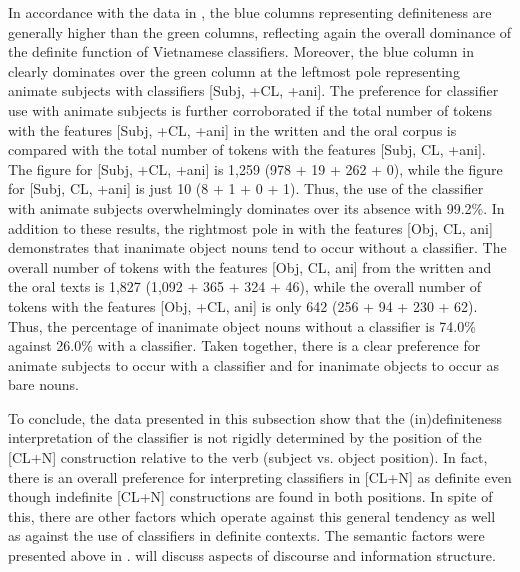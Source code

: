 \documentclass[output=paper]{langsci/langscibook}
\begin{document}
In accordance with the data in , the blue columns representing definiteness are generally higher than the green columns, reflecting again the overall dominance of the definite function of Vietnamese classifiers. Moreover, the blue column in  clearly dominates over the green column at the leftmost pole representing animate subjects with classifiers [Subj, +CL, +ani]. The preference for classifier use with animate subjects is further corroborated if the total number of tokens with the features [Subj, +CL, +ani] in the written and the oral corpus is compared with the total number of tokens with the features [Subj, \minus CL, +ani]. The figure for [Subj, +CL, +ani] is 1,259 (978 + 19 + 262 + 0), while the figure for [Subj, \minus CL, +ani] is just 10 (8 + 1 + 0 + 1). Thus, the use of the classifier with animate subjects overwhelmingly dominates over its absence with 99.2\%. In addition to these results, the rightmost pole in  with the features [Obj, \minus CL, \minus ani] demonstrates that inanimate object nouns tend to occur without a classifier. The overall number of tokens with the features [Obj, \minus CL, \minus ani] from the written and the oral texts is 1,827 (1,092 + 365 + 324 + 46), while the overall number of tokens with the features [Obj, +CL, \minus ani] is only 642 (256 + 94 + 230 + 62). Thus, the percentage of inanimate object nouns without a classifier is 74.0\% against 26.0\% with a classifier. Taken together, there is a clear preference for animate subjects to occur with a classifier and for inanimate objects to occur as bare nouns.

\largerpage
To conclude, the data presented in this subsection show that the (in)definite\-ness interpretation of the classifier is not rigidly determined by the position of the [CL+N] construction relative to the verb (subject vs. object position). In fact, there is an overall preference for interpreting classifiers in [CL+N] as definite even though indefinite [CL+N] constructions are found in both positions. In spite of this, there are other factors which operate against this general tendency as well as against the use of classifiers in definite contexts. The semantic factors were presented above in .  will discuss aspects of discourse and information structure.
\end{document}

